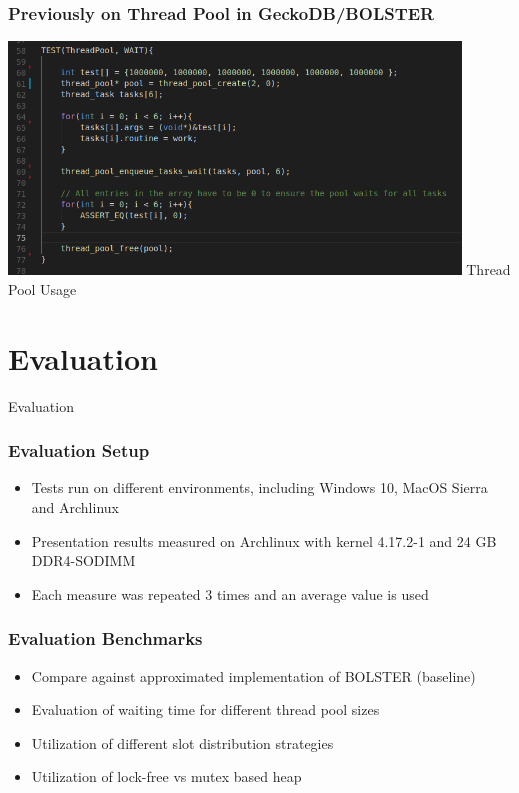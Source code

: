 \documentclass{beamer}
\begin{document}
\begin{frame}
	\frametitle{Previously on Thread Pool in GeckoDB/BOLSTER}
	\begin{center}
		\includegraphics[width=0.9\textwidth]{img/thread_pool_use.png}
		Thread Pool Usage
	\end{center}
\end{frame}

\section{Evaluation}
\begin{frame}
	\begin{center}
		\huge Evaluation
	\end{center}
\end{frame}

\begin{frame}
	\frametitle{Evaluation Setup}
	\begin{itemize}
		\item Tests run on different environments, including Windows 10, MacOS Sierra and Archlinux
		\item Presentation results measured on Archlinux with kernel 4.17.2-1 and 24 GB DDR4-SODIMM
		\item Each measure was repeated 3 times and an average value is used
	\end{itemize}
\end{frame}

\begin{frame}
	\frametitle{Evaluation Benchmarks}
	\begin{itemize}
		\item Compare against approximated implementation of BOLSTER (baseline)
		\item Evaluation of waiting time for different thread pool sizes
		\item Utilization of different slot distribution strategies
		\item Utilization of lock-free vs mutex based heap
	\end{itemize}
\end{frame}
\end{document}

